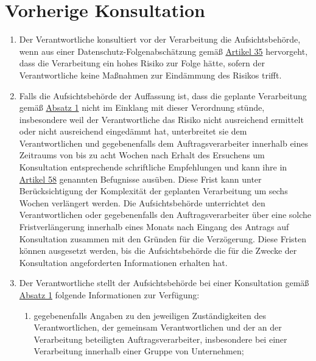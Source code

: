 \chapter{Vorherige Konsultation}
\label{ch:36}


\begin{enumerate}

  \item Der Verantwortliche konsultiert vor der Verarbeitung die Aufsichtsbehörde, wenn aus einer
   Datenschutz-Folgenabschätzung gemäß \hyperref[ch:35]{Artikel 35} hervorgeht, dass die Verarbeitung ein hohes Risiko
   zur Folge hätte, sofern der Verantwortliche keine Maßnahmen zur Eindämmung des Risikos trifft.
  \label{itm:36-1}

  \item Falls die Aufsichtsbehörde der Auffassung ist, dass die geplante Verarbeitung gemäß \hyperref[itm:36-1]
   {Absatz 1} nicht im Einklang mit dieser Verordnung stünde, insbesondere weil der Verantwortliche das Risiko nicht
   ausreichend ermittelt oder nicht ausreichend eingedämmt hat, unterbreitet sie dem Verantwortlichen und
   gegebenenfalls dem Auftragsverarbeiter innerhalb eines Zeitraums von bis zu acht Wochen nach Erhalt des Ersuchens um
   Konsultation entsprechende schriftliche Empfehlungen und kann ihre in \hyperref[ch:58]{Artikel 58} genannten
   Befugnisse ausüben. Diese Frist kann unter Berücksichtigung der Komplexität der geplanten Verarbeitung um sechs
   Wochen verlängert werden. Die Aufsichtsbehörde unterrichtet den Verantwortlichen oder gegebenenfalls den
   Auftragsverarbeiter über eine solche Fristverlängerung innerhalb eines Monats nach Eingang des Antrags auf
   Konsultation zusammen mit den Gründen für die Verzögerung. Diese Fristen können ausgesetzt werden, bis die
   Aufsichtsbehörde die für die Zwecke der Konsultation angeforderten Informationen erhalten hat.
  \label{itm:36-2}

  \item Der Verantwortliche stellt der Aufsichtsbehörde bei einer Konsultation gemäß \hyperref[itm:36-1]{Absatz 1}
   folgende Informationen zur Verfügung:
  \label{itm:36-3}

  \begin{enumerate}
  
    \item gegebenenfalls Angaben zu den jeweiligen Zuständigkeiten des Verantwortlichen, der gemeinsam Verantwortlichen
     und der an der Verarbeitung beteiligten Auftragsverarbeiter, insbesondere bei einer Verarbeitung innerhalb einer
     Gruppe von Unternehmen;
    \label{itm:36-3a}


\end{enumerate}
\end{enumerate}
